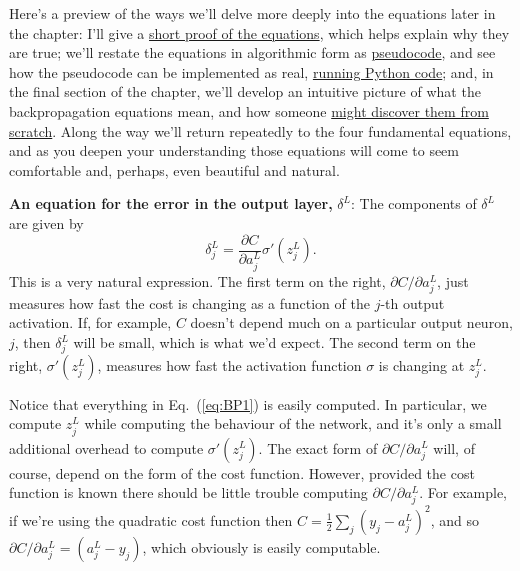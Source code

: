 \documentclass[a4paper,twoside,10pt]{book}
\begin{document}
Here's a preview of the ways we'll delve more deeply into the equations later in the chapter: I'll give a \hyperref[sec:2.5]{short proof of the equations}, which helps explain why they are true; we'll restate the equations in algorithmic form as \hyperref[sec:2.6]{pseudocode}, and see how the pseudocode can be implemented as real, \hyperref[sec:2.7]{running Python code}; and, in the final section of the chapter, we'll develop an intuitive picture of what the backpropagation equations mean, and how someone \hyperref[sec:2.9]{might discover them from scratch}. Along the way we'll return repeatedly to the four fundamental equations, and as you deepen your understanding those equations will come to seem comfortable and, perhaps, even beautiful and natural.

\textbf{An equation for the error in the output layer,} $\delta^L$: The components of $\delta^L$ are given by
\begin{equation}
	\delta^L_j = \frac{\partial C}{\partial a^L_j} \sigma'(z^L_j).
	\tag{BP1}\label{eq:BP1}
\end{equation}
This is a very natural expression. The first term on the right, $\partial{}C/\partial{}a^L_j$, just measures how fast the cost is changing as a function of the $j$-th output activation. If, for example, $C$ doesn't depend much on a particular output neuron, $j$, then $\delta^L_j$ will be small, which is what we'd expect. The second term on the right, $\sigma'(z^L_j)$, measures how fast the activation function $\sigma$ is changing at $z^L_j$.

Notice that everything in Eq.~(\ref{eq:BP1}) is easily computed. In particular, we compute $z^L_j$ while computing the behaviour of the network, and it's only a small additional overhead to compute $\sigma'(z^L_j)$. The exact form of $\partial{}C/\partial{}a^L_j$ will, of course, depend on the form of the cost function. However, provided the cost function is known there should be little trouble computing $\partial{}C/\partial{}a^L_j$. For example, if we're using the quadratic cost function then $C=\frac12\sum_j(y_j-a^L_j)^2$, and so $\partial{}C/\partial{}a^L_j=(a^L_j-y_j)$, which obviously is easily computable.
\end{document}

